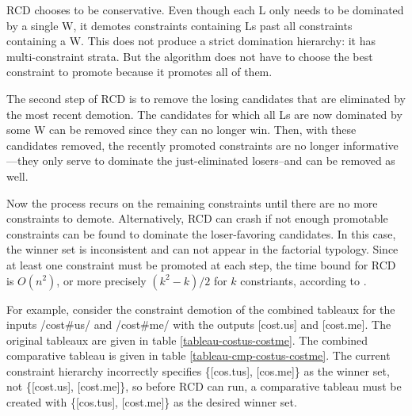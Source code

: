 \documentclass[11pt]{article}
\begin{document}
RCD chooses to be conservative. Even though each L only needs to
be dominated by a single W, it demotes constraints containing Ls past all
constraints containing a W. This does not produce a strict domination
hierarchy: it has multi-constraint strata. But the algorithm does not
have to choose the best constraint to promote because it promotes all
of them.

The second step of RCD is to remove the losing candidates that are
eliminated by the most recent demotion. The candidates
for which all Ls are now dominated by some W can be removed since they
can no longer win. Then, with these candidates removed, the recently
promoted constraints are no longer informative---they only serve to
dominate the just-eliminated losers--and can be removed as
well.

Now the process recurs on the remaining constraints until there are no
more constraints to demote. Alternatively, RCD can crash if not enough
promotable constraints can be found to dominate the loser-favoring
candidates. In this case, the winner set is inconsistent and can not
appear in the factorial typology. Since at least one constraint must
be promoted at each step, the time bound for RCD is $O(n^2)$, or more
precisely $(k^2 - k) / 2$ for $k$ constriants, according to
.

For example, consider the constraint demotion of the combined tableaux
for the inputs /cost\#us/ and /cost\#me/ with the outputs [cost.us]
and [cost.me]. The original tableaux are given in table
\ref{tableau-costus-costme}. The combined comparative tableau is given
in table \ref{tableau-cmp-costus-costme}. The current constraint
hierarchy incorrectly specifies \{[cos.tus], [cos.me]\} as the winner
set, not \{[cost.us], [cost.me]\}, so before RCD can run, a
comparative tableau must be created with \{[cos.tus], [cost.me]\} as
the desired winner set.
\end{document}
